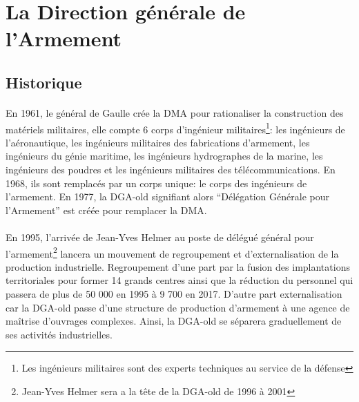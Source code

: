 \documentclass[11pt, book, english, french, standardlists]{upmethodology-document}
\begin{document}
		\section{La Direction générale de l'Armement}
			\subsection{Historique}
				\paragraph*{}
					En 1961, le général de Gaulle crée la \gls{DMA} pour rationaliser la construction des matériels militaires, elle compte 6 corps d'ingénieur militaires\footnote{Les ingénieurs militaires sont des experts techniques au service de la défense}: les ingénieurs de l'aéronautique, les ingénieurs militaires des fabrications d'armement, les ingénieurs du génie maritime, les ingénieurs hydrographes de la marine, les ingénieurs des poudres et les ingénieurs militaires des télécommunications. En 1968, ils sont remplacés par un corps unique: le corps des ingénieurs de l'armement. En 1977, la \acrshort{DGA-old} signifiant alors ``Délégation Générale pour l'Armement'' est créée pour remplacer la \gls{DMA}.
				\paragraph*{}
					En 1995, l'arrivée de Jean-Yves Helmer au poste de délégué général pour l'armement\footnote{Jean-Yves Helmer sera a la tête de la \acrshort{DGA-old} de 1996 à 2001} lancera un mouvement de regroupement et d'externalisation de la production industrielle. Regroupement d'une part par la fusion des implantations territoriales pour former 14 grands centres ainsi que la réduction du personnel qui passera de plus de 50 000 en 1995 à 9 700 en 2017. D'autre part externalisation car la \acrshort{DGA-old} passe d'une structure de production d'armement à une agence de maîtrise d'ouvrages complexes. Ainsi, la \acrshort{DGA-old} se séparera graduellement de ses activités industrielles.
\end{document}
